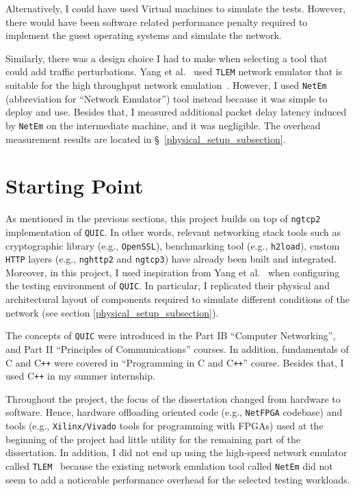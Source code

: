 \documentclass[12pt,a4paper]{report}
\newcommand\note[2]{{\color{#1}\bf #2}}
\newcommand\simon[1]{\ifcomments{\note{cyan}{SM: #1}}\fi}
\begin{document}
 Alternatively, I could have used Virtual machines to simulate the tests.
 However, there would have been software related performance penalty required to implement the guest operating systems and simulate the network.
 
 Similarly, there was a design choice I had to make when selecting a tool that could add traffic perturbations.
 Yang et al.~\cite{Making_QUIC_Quicker} used \texttt{TLEM} network emulator that is suitable for the high throughput network emulation~\cite{Very_high_speed_link_emulation_with_TLEM}.
 However, I used \texttt{NetEm} (abbreviation for \enquote{Network Emulator}) tool instead because it was simple to deploy and use.
 Besides that, I measured additional packet delay latency induced by \texttt{NetEm} on the intermediate machine, and it was negligible.
 The overhead measurement results are located in \S~\ref{physical_setup_subsection}.


\section{Starting Point}
As mentioned in the previous sections, this project builds on top of \texttt{ngtcp2} implementation of \texttt{QUIC}.
In other words, relevant networking stack tools such as cryptographic library (e.g., \texttt{OpenSSL}), benchmarking tool (e.g., \texttt{h2load}), custom \texttt{HTTP} layers (e.g., \texttt{nghttp2} and \texttt{ngtcp3}) have already been built and integrated. 
Moreover, in this project, I used inspiration from Yang et al.~\cite{Making_QUIC_Quicker} when configuring the testing environment of \texttt{QUIC}.
In particular, I replicated their physical and architectural layout of components required to simulate different conditions of the network (see section \ref{physical_setup_subsection}).

The concepts of \texttt{QUIC} were introduced in the Part IB \enquote{Computer Networking}, and Part II \enquote{Principles of Communications} courses.
In addition, fundamentals of C and C\texttt{++} were covered in \enquote{Programming in C and C\texttt{++}} course. 
Besides that, I used C\texttt{++} in my summer internship.

Throughout the project, the focus of the dissertation changed from hardware to software.
Hence, hardware offloading oriented code (e.g., \texttt{NetFPGA} codebase) and tools (e.g., \texttt{Xilinx/Vivado} tools for programming with FPGAs) used at the beginning of the project had little utility for the remaining part of the dissertation.
In addition, I did not end up using the high-speed network emulator called \texttt{TLEM}~\cite{TLEM_tool} because the existing network emulation tool called \texttt{NetEm} did not seem to add a noticeable performance overhead for the selected testing workloads.
\end{document}
